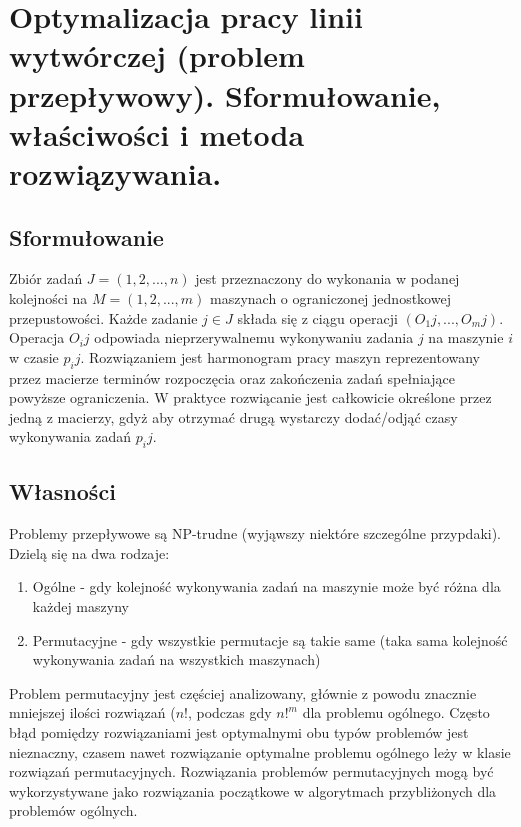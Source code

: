 \section{Optymalizacja pracy linii wytwórczej (problem przepływowy).
Sformułowanie, właściwości
i metoda rozwiązywania.}

	\subsection{Sformułowanie}
		Zbiór zadań $J=(1,2,...,n)$ jest przeznaczony do wykonania w podanej kolejności na $M=(1,2,...,m)$ maszynach o ograniczonej jednostkowej przepustowości. Każde zadanie $j\in J$ składa się z ciągu operacji $(O_1j, ..., O_mj)$. Operacja $O_ij$ odpowiada nieprzerywalnemu wykonywaniu zadania $j$ na maszynie $i$ w czasie $p_ij$. Rozwiązaniem jest harmonogram pracy maszyn reprezentowany przez macierze terminów rozpoczęcia oraz zakończenia zadań spełniające powyższe ograniczenia. W praktyce rozwiącanie jest całkowicie określone przez jedną z macierzy, gdyż aby otrzymać drugą wystarczy dodać/odjąć czasy wykonywania zadań $p_ij$. 

		
	\subsection{Własności}
	Problemy przepływowe są NP-trudne (wyjąwszy niektóre szczególne przypdaki).
	Dzielą się na dwa rodzaje:
\begin{enumerate}
\item Ogólne - gdy kolejność wykonywania zadań na maszynie może być różna dla każdej maszyny
\item Permutacyjne - gdy wszystkie permutacje są takie same (taka sama kolejność wykonywania zadań na wszystkich maszynach)
\end{enumerate}
	Problem permutacyjny jest częściej analizowany, głównie z powodu znacznie mniejszej ilości rozwiązań ($n!$, podczas gdy $n!^m$ dla problemu ogólnego. Często błąd pomiędzy rozwiązaniami jest optymalnymi obu typów problemów jest nieznaczny, czasem nawet rozwiązanie optymalne problemu ogólnego leży w klasie rozwiązań permutacyjnych. Rozwiązania problemów permutacyjnych mogą być wykorzystywane jako rozwiązania początkowe w algorytmach przybliżonych dla problemów ogólnych.
	
		
